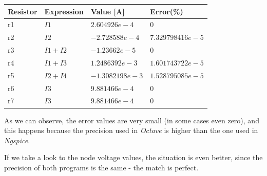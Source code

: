 \begin{table}[ht]
\centering
\begin{tabularx}{0.8\textwidth} {
  | >{\raggedright\arraybackslash}X
  | >{\centering\arraybackslash}X
  | >{\centering\arraybackslash}X
  | >{\raggedleft\arraybackslash}X | }
 \hline
 Resistor & Expression & Value [A] & Error(\%)\\
 \hline
 r1 & $I1$ & $2.604926e-4$ & $0$ \\
 \hline
 r2 & $I2$ & $-2.728588e-4$ & $7.329798416e-5$ \\
 \hline
 r3 & $I1+I2$ & $-1.23662e-5$ & $0$ \\
 \hline
 r4 & $I1+I3$ & $1.2486392e-3$ & $1.601743722e-5$ \\
 \hline
 r5 & $I2+I4$ & $-1.3082198e-3$ & $1.528795085e-5$ \\
 \hline
 r6 & $I3$ & $9.881466e-4$ & $0$ \\
 \hline
 r7 & $I3$ & $9.881466e-4$ & $0$ \\
\hline
\end{tabularx}
\end{table}

\vspace{5mm}
\par As we can observe, the error values are very small (in some cases even zero), and this happens because the precision used in \emph{Octave} is higher than the one used in \emph{Ngspice}.
\par If we take a look to the node voltage values, the situation is even better, since the precision of both programs is the same - the match is perfect.

